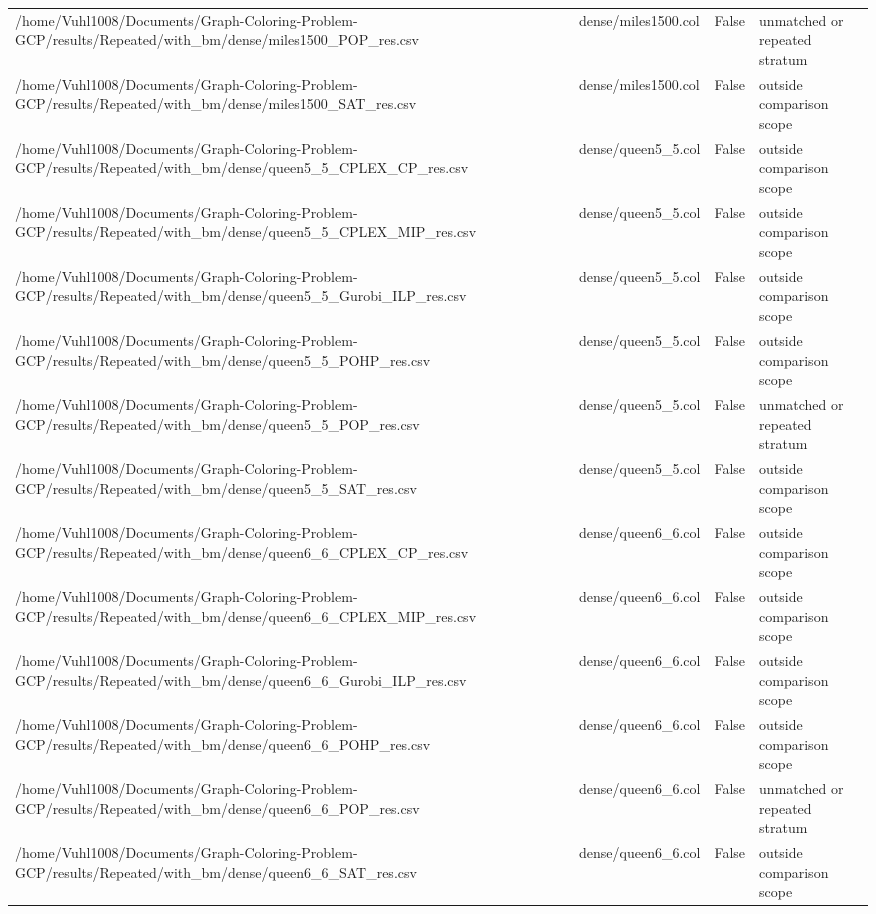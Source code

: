 \begin{table}[htbp]
\begin{tabular}{llll}
/home/Vuhl1008/Documents/Graph-Coloring-Problem-GCP/results/Repeated/with\_bm/dense/miles1500\_POP\_res.csv & dense/miles1500.col & False & unmatched or repeated stratum \\
/home/Vuhl1008/Documents/Graph-Coloring-Problem-GCP/results/Repeated/with\_bm/dense/miles1500\_SAT\_res.csv & dense/miles1500.col & False & outside comparison scope \\
/home/Vuhl1008/Documents/Graph-Coloring-Problem-GCP/results/Repeated/with\_bm/dense/queen5\_5\_CPLEX\_CP\_res.csv & dense/queen5\_5.col & False & outside comparison scope \\
/home/Vuhl1008/Documents/Graph-Coloring-Problem-GCP/results/Repeated/with\_bm/dense/queen5\_5\_CPLEX\_MIP\_res.csv & dense/queen5\_5.col & False & outside comparison scope \\
/home/Vuhl1008/Documents/Graph-Coloring-Problem-GCP/results/Repeated/with\_bm/dense/queen5\_5\_Gurobi\_ILP\_res.csv & dense/queen5\_5.col & False & outside comparison scope \\
/home/Vuhl1008/Documents/Graph-Coloring-Problem-GCP/results/Repeated/with\_bm/dense/queen5\_5\_POHP\_res.csv & dense/queen5\_5.col & False & outside comparison scope \\
/home/Vuhl1008/Documents/Graph-Coloring-Problem-GCP/results/Repeated/with\_bm/dense/queen5\_5\_POP\_res.csv & dense/queen5\_5.col & False & unmatched or repeated stratum \\
/home/Vuhl1008/Documents/Graph-Coloring-Problem-GCP/results/Repeated/with\_bm/dense/queen5\_5\_SAT\_res.csv & dense/queen5\_5.col & False & outside comparison scope \\
/home/Vuhl1008/Documents/Graph-Coloring-Problem-GCP/results/Repeated/with\_bm/dense/queen6\_6\_CPLEX\_CP\_res.csv & dense/queen6\_6.col & False & outside comparison scope \\
/home/Vuhl1008/Documents/Graph-Coloring-Problem-GCP/results/Repeated/with\_bm/dense/queen6\_6\_CPLEX\_MIP\_res.csv & dense/queen6\_6.col & False & outside comparison scope \\
/home/Vuhl1008/Documents/Graph-Coloring-Problem-GCP/results/Repeated/with\_bm/dense/queen6\_6\_Gurobi\_ILP\_res.csv & dense/queen6\_6.col & False & outside comparison scope \\
/home/Vuhl1008/Documents/Graph-Coloring-Problem-GCP/results/Repeated/with\_bm/dense/queen6\_6\_POHP\_res.csv & dense/queen6\_6.col & False & outside comparison scope \\
/home/Vuhl1008/Documents/Graph-Coloring-Problem-GCP/results/Repeated/with\_bm/dense/queen6\_6\_POP\_res.csv & dense/queen6\_6.col & False & unmatched or repeated stratum \\
/home/Vuhl1008/Documents/Graph-Coloring-Problem-GCP/results/Repeated/with\_bm/dense/queen6\_6\_SAT\_res.csv & dense/queen6\_6.col & False & outside comparison scope \\
\hline
\end{tabular}
\end{table}
